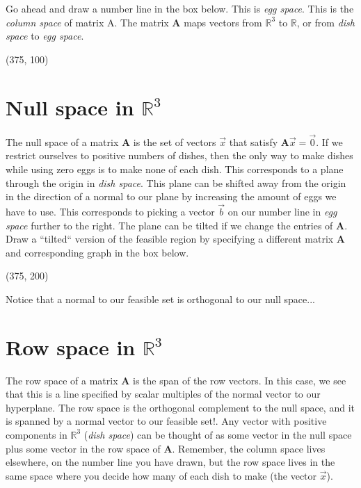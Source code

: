 \documentclass[11pt]{article}
\theoremstyle{plain} %
\theoremstyle{definition}
\theoremstyle{remark}
\begin{document}
Go ahead and draw a number line in the box below. This is \textit{egg space}. This is the \textit{column space} of matrix A. The matrix $\mathbf{A}$ maps vectors from $\mathbb{R}^3$ to $\mathbb{R}$, or from \textit{dish space} to \textit{egg space}.

\begin{center}\framebox(375, 100){}\end{center}

\section{Null space in $\mathbb{R}^3$}

The null space of a matrix $\mathbf{A}$ is the set of vectors $\vec{x}$ that satisfy $\mathbf{A}\vec{x}=\vec{0}$. If we restrict ourselves to positive numbers of dishes, then the only way to make dishes while using zero eggs is to make none of each dish. This corresponds to a plane through the origin in \textit{dish space}. This plane can be shifted away from the origin in the direction of a normal to our plane by increasing the amount of eggs we have to use. This corresponds to picking a vector $\vec{b}$ on our number line in \textit{egg space} further to the right. The plane can be tilted if we change the entries of $\mathbf{A}$. Draw a ``tilted`` version of the feasible region by specifying a different matrix $\mathbf{A}$ and corresponding graph in the box below.

\begin{center}\framebox(375, 200){}\end{center}

\bigskip

Notice that a normal to our feasible set is orthogonal to our null space...

\section{Row space in $\mathbb{R}^3$}

The row space of a  matrix $\mathbf{A}$ is the span of the row vectors. In this case, we see that this is a line specified by scalar multiples of the normal vector to our hyperplane. The row space is the orthogonal complement to the null space, and it is spanned by a normal vector to our feasible set!. Any vector with positive components in $\mathbb{R}^3$ (\textit{dish space}) can be thought of as some vector in the null space plus some vector in the row space of $\mathbf{A}$. Remember, the column space lives elsewhere, on the number line you have drawn, but the row space lives in the same space where you decide how many of each dish to make (the vector $\vec{x}$).
\end{document}
